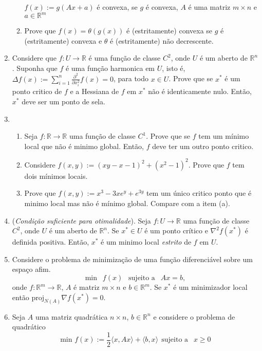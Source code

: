 \documentclass[a4paper,latin]{article}
\begin{document}
\begin{enumerate}
\begin{enumerate}
    $f(x):=g(Ax+a)$ é convexa, 
    se $g$ é convexa, $A$ é uma matriz $m \times n$ e
    $a \in \mathbb{R}^{m}$
    \item Prove que 
    $f(x)=\theta(g(x))$
    é (estritamente) convexa se 
    $g$ é (estritamente) convexa e $\theta$ é 
    (estritamente)
    não decrescente.
    \end{enumerate}
    \item Considere que $f:U \rightarrow \mathbb{R}$ é uma função de classe $C^{2}$, onde $U$ é um aberto de $\mathbb{R}^{n}$.
    Suponha que $f$ é uma função harmonica em $U$, isto é, 
    $\Delta f(x):= \sum_{i=1}^{n} \frac{\partial^2}{\partial x_i^{2}} f(x)=0$, para todo $x \in U$.
    Prove que se $x^*$ é um ponto critico de $f$ e a 
    Hessiana de $f$ em $x^*$ não 
    é identicamente nulo. Então, $x^*$ deve ser um ponto de sela.  
    \item 
       \begin{enumerate}
       	\item Seja $f:\mathbb{R} \rightarrow \mathbb{R}$ uma função de classe $C^{1}$. Prove que se $f$ tem um mínimo local que não é 
       	minimo global. Então, $f$ deve ter um outro ponto critico.
       	\item Considere $f(x,y):=(xy-x-1)^2+(x^2-1)^2$. Prove que
       $f$ tem dois mínimos locais. 
       \item Prove que $f(x,y):=x^3-3xe^y+e^{3y}$ tem um único critico ponto que é minimo local mas não é mínimo global. Compare com a item (a).
       \end{enumerate}
    \item ({\it Condição suficiente para otimalidade}).
    Seja $f: U \rightarrow \mathbb{R}$ uma função de classe $C^{2}$, onde $U$ é um aberto de $\mathbb{R}^{n}$. 
    Se $x^* \in U$ é um ponto crítico e $\nabla^2 f(x^*)$
    é definida positiva. Então, $x^*$ 
    é um minimo local {\it estrito} de $f$ em $U$.
    \item Considere o problema de minimização de uma função diferenciável sobre um espaço afim.
    $$\text{min } \ \  f(x) \ \ \text{  sujeito a  } \ \ Ax=b, $$ 
    onde $f:\mathbb{R}^m\rightarrow \mathbb{R}$,
     $A$ é matriz $m \times n$
    e $b \in \mathbb{R}^m$. Se $x^*$ é um minimizador local então 
    $\text{proj}_{N(A)}\nabla f(x^*)=0$. 
    \item Seja $A$ uma matriz quadrática $n \times n$,  
    $b \in \mathbb{R}^{n}$ e considere o problema de quadrático 
    $$\text{min } f(x):=\frac{1}{2} \langle x, Ax \rangle + \langle b, x\rangle \ \ \text{sujeito a } \ \ x \geq 0 $$ 

\end{enumerate}
\end{document}
